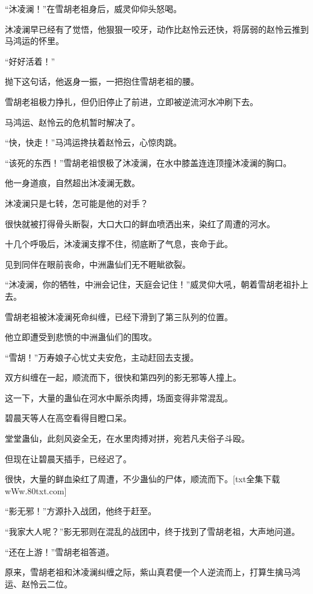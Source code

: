 
\begin{this_body}

“沐凌澜！”在雪胡老祖身后，威灵仰仰头怒喝。

沐凌澜早已经有了觉悟，他狠狠一咬牙，动作比赵怜云还快，将孱弱的赵怜云推到马鸿运的怀里。

“好好活着！”

抛下这句话，他返身一振，一把抱住雪胡老祖的腰。

雪胡老祖极力挣扎，但仍旧停止了前进，立即被逆流河水冲刷下去。

马鸿运、赵怜云的危机暂时解决了。

“快，快走！”马鸿运搀扶着赵怜云，心惊肉跳。

“该死的东西！”雪胡老祖恨极了沐凌澜，在水中膝盖连连顶撞沐凌澜的胸口。

他一身道痕，自然超出沐凌澜无数。

沐凌澜只是七转，怎可能是他的对手？

很快就被打得骨头断裂，大口大口的鲜血喷洒出来，染红了周遭的河水。

十几个呼吸后，沐凌澜支撑不住，彻底断了气息，丧命于此。

见到同伴在眼前丧命，中洲蛊仙们无不睚眦欲裂。

“沐凌澜，你的牺牲，中洲会记住，天庭会记住！”威灵仰大吼，朝着雪胡老祖扑上去。

雪胡老祖被沐凌澜死命纠缠，已经下滑到了第三队列的位置。

他立即遭受到悲愤的中洲蛊仙们的围攻。

“雪胡！”万寿娘子心忧丈夫安危，主动赶回去支援。

双方纠缠在一起，顺流而下，很快和第四列的影无邪等人撞上。

这一下，大量的蛊仙在河水中厮杀肉搏，场面变得非常混乱。

碧晨天等人在高空看得目瞪口呆。

堂堂蛊仙，此刻风姿全无，在水里肉搏对拼，宛若凡夫俗子斗殴。

但现在让碧晨天插手，已经迟了。

很快，大量的鲜血染红了周遭，不少蛊仙的尸体，顺流而下。[txt全集下载wWw.80txt.com]

“影无邪！”方源扑入战团，他终于赶至。

“我家大人呢？”影无邪则在混乱的战团中，终于找到了雪胡老祖，大声地问道。

“还在上游！”雪胡老祖答道。

原来，雪胡老祖和沐凌澜纠缠之际，紫山真君便一个人逆流而上，打算生擒马鸿运、赵怜云二位。


\end{this_body}
